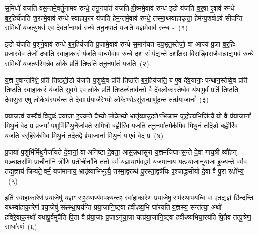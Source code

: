 \setcounter{anuvakam}{0}
स॒मिधो॑ यजति वस॒न्तमे॒वर्तू॒नामव॑ रुन्धे॒ तनू॒नपा॑तं यजति ग्री॒ष्ममे॒वाव॑ रुन्ध इ॒डो य॑जति व॒र्॒\mbox{}षा ए॒वाव॑ रुन्धे ब॒र्॒\mbox{}हिर्य॑जति श॒रद॑मे॒वाव॑ रुन्धे स्वाहाका॒रं य॑जति हेम॒न्तमे॒वाव॑ रुन्धे॒ तस्मा॒थ्\-स्वाहा॑कृता॒ हेम॑न्प॒शवो\-ऽव॑ सीदन्ति स॒मिधो॑ यजत्यु॒षस॑ ए॒व दे॒वता॑ना॒मव॑ रुन्धे॒ तनू॒नपा॑तं यजति य॒ज्ञमे॒वाव॑ रुन्ध~-~(१)\ip

इ॒डो य॑जति प॒शूने॒वाव॑ रुन्धे ब॒र्॒\mbox{}हिर्य॑जति प्र॒जामे॒वाव॑ रुन्धे स॒मान॑यत उप॒भृत॒स्तेजो॒ वा आज्यं॑ प्र॒जा ब॒र्॒\mbox{}हिः प्र॒जास्वे॒व तेजो॑ दधाति स्वाहाका॒रं य॑जति॒ वाच॑मे॒वाव॑ रुन्धे॒ दश॒ सं प॑द्यन्ते॒ दशा᳚क्षरा वि॒राड्वि॒राजै॒वान्नाद्य॒मव॑ रुन्धे स॒मिधो॑ यजत्य॒स्मिन्ने॒व लो॒के प्रति॑ तिष्ठति॒ तनू॒नपा॑तं यजति~(२)\ip

य॒ज्ञ ए॒वान्तरि॑क्षे॒ प्रति॑ तिष्ठती॒डो य॑जति प॒शुष्वे॒व प्रति॑ तिष्ठति ब॒र्॒\mbox{}हिर्य॑जति॒ य ए॒व दे॑व॒यानाः॒ पन्था॑न॒स्तेष्वे॒व प्रति॑ तिष्ठति स्वाहाका॒रं य॑जति सुव॒र्ग ए॒व लो॒के प्रति॑ तिष्ठत्ये॒ताव॑न्तो॒ वै दे॑व\-लो॒का\-स्तेष्वे॒व य॑थापू॒र्वं प्रति॑ तिष्ठति देवासु॒रा ए॒षु लो॒केष्व॑स्पर्धन्त॒ ते दे॒वाः प्र॑या॒जैरे॒भ्यो लो॒केभ्यो\-ऽसु॑रा॒न्प्राणु॑दन्त॒ तत्प्र॑या॒जानां᳚~(३)\ip

प्रयाज॒त्वं यस्यै॒वं वि॒दुषः॑ प्रया॒जा इ॒ज्यन्ते॒ प्रैभ्यो लो॒केभ्यो॒ भ्रातृ॑व्यान्नुदते\-ऽभि॒क्रामं॑ जुहोत्य॒भिजि॑त्यै॒ यो वै प्र॑या॒जानां᳚ मिथु॒नं वेद॒ प्र प्र॒जया॑ प॒शुभि॑र्मिथु॒नैर्जा॑यते स॒मिधो॑ ब॒ह्वीरि॑व यजति॒ तनू॒नपा॑त॒मेक॑मिव मिथु॒नं तदि॒डो ब॒ह्वीरि॑व यजति ब॒र्॒\mbox{}हिरेक॑मिव मिथु॒नं तदे॒तद्वै प्र॑या॒जानां᳚ मिथु॒नं य ए॒वं वेद॒ प्र~(४)\ip

प्र॒जया॑ प॒शुभि॑र्मिथु॒नैर्जा॑यते दे॒वानां॒ वा अनि॑ष्टा दे॒वता॒ आस॒\-न्नथा\-सु॑रा य॒ज्ञम॑\-जिघाꣳस॒न्ते दे॒वा गा॑य॒त्रीं व्यौ॑ह॒न् पञ्चा॒क्षरा॑णि प्रा॒ची\-ना॑नि॒ त्रीणि॑ प्रती॒चीना॑नि॒ ततो॒ वर्म॑ य॒ज्ञायाभ॑व॒द्वर्म॒ यज॑मानाय॒ यत्प्र॑या\-जा\-नू\-या॒जा इ॒ज्यन्ते॒ वर्मै॒व तद्य॒ज्ञाय॑ क्रियते॒ वर्म॒ यज॑मानाय॒ भ्रातृ॑व्या\-भिभूत्यै॒ तस्मा॒द्वरू॑थं पु॒रस्ता॒द्वर्\mbox{}षी॑यः प॒श्चाद्ध्रसी॑यो दे॒वा वै पु॒रा रक्षो᳚भ्य॒~-~(५)\ip

इति॑ स्वाहा\-का॒रेण॑ प्रया॒जेषु॑ य॒ज्ञꣳ स॒ꣴ॒स्थाप्य॑मपश्य॒न्तꣴ स्वा॑हा\-का॒रेण॑ प्रया॒जेषु॒ सम॑स्थापय॒न्वि वा ए॒तद्य॒ज्ञं छि॑न्दन्ति॒ यथ्\-स्वा॑हा\-का॒रेण॑ प्रया॒जेषु॑ सꣴस्था॒पय॑न्ति प्रया॒जानि॒ष्ट्वा ह॒वीꣴष्य॒भि घा॑रयति य॒ज्ञस्य॒ सन्त॑त्या॒ अथो॑ ह॒विरे॒वाक॒रथो॑ यथापू॒र्वमुपै॑ति पि॒ता वै प्र॑या॒जाः प्र॒जा\-ऽनू॑या॒जा यत्प्र॑या॒जानि॒ष्ट्वा ह॒वीꣴष्य॑भिघा॒रय॑ति पि॒तैव तत्पु॒त्रेण॒ साधा॑रणं~(६)\ip

